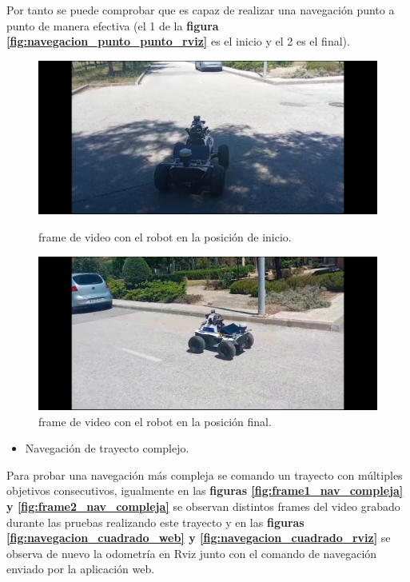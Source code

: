 Por tanto se puede comprobar que es capaz de realizar una navegación punto a punto de manera efectiva (el 1 de la \textbf{figura \ref{fig:navegacion_punto_punto_rviz}} es el inicio y el 2 es el final).
\begin{figure}[htbp]
  \centering
  \begin{minipage}[b]{0.45\textwidth}
    \centering
    \includegraphics[width=\textwidth]{images/video_principio_punto_nav.jpeg}
    \caption{frame de video con el robot en la posición de inicio.}
    \label{fig:frame1_nav_punto_punto}
  \end{minipage}
  \hfill
  \begin{minipage}[b]{0.45\textwidth}
    \centering
    \includegraphics[width=\textwidth]{images/video_final_punto_nav.jpeg}
    \caption{frame de video con el robot en la posición final.}
    \label{fig:frame2_nav_punto_punto}
  \end{minipage}
\end{figure}
\newpage
\begin{itemize}
  \item Navegación de trayecto complejo.
\end{itemize}
Para probar una navegación más compleja se comando un trayecto con múltiples objetivos consecutivos, igualmente en las \textbf{figuras \ref{fig:frame1_nav_compleja} y \ref{fig:frame2_nav_compleja}} se observan distintos frames 
del video grabado durante las pruebas realizando este trayecto y en las \textbf{figuras \ref{fig:navegacion_cuadrado_web} y \ref{fig:navegacion_cuadrado_rviz}} se observa de nuevo la odometría en Rviz junto con el comando de navegación enviado por la 
aplicación web.

